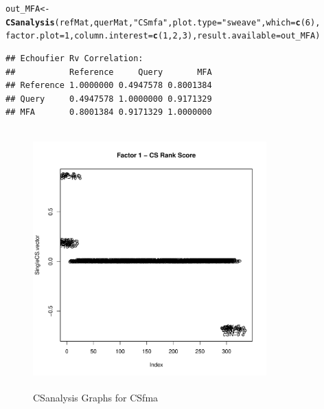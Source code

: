 \documentclass[a4paper]{article}\usepackage[]{graphicx}\usepackage[]{color}
\makeatletter
\newcommand{\hlnum}[1]{\textcolor[rgb]{0.686,0.059,0.569}{#1}}%
\newcommand{\hlstr}[1]{\textcolor[rgb]{0.192,0.494,0.8}{#1}}%
\newcommand{\hlstd}[1]{\textcolor[rgb]{0.345,0.345,0.345}{#1}}%
\newcommand{\hlkwb}[1]{\textcolor[rgb]{0.69,0.353,0.396}{#1}}%
\newcommand{\hlkwc}[1]{\textcolor[rgb]{0.333,0.667,0.333}{#1}}%
\newcommand{\hlkwd}[1]{\textcolor[rgb]{0.737,0.353,0.396}{\textbf{#1}}}%
\newenvironment{kframe}{%
 \def\at@end@of@kframe{}%
 \ifinner\ifhmode%
  \def\at@end@of@kframe{\end{minipage}}%
  \begin{minipage}{\columnwidth}%
 \fi\fi%
 \def\FrameCommand##1{\hskip\@totalleftmargin \hskip-\fboxsep
 \colorbox{shadecolor}{##1}\hskip-\fboxsep
     \hskip-\linewidth \hskip-\@totalleftmargin \hskip\columnwidth}%
 \MakeFramed {\advance\hsize-\width
   \@totalleftmargin\z@ \linewidth\hsize
   \@setminipage}}%
 {\par\unskip\endMakeFramed%
 \at@end@of@kframe}
\newenvironment{knitrout}{}{} %
\makeatother
\begin{document}
\begin{knitrout}
\color{fgcolor}\begin{kframe}
\begin{alltt}
        \hlstd{out_MFA} \hlkwb{<-} \hlkwd{CSanalysis}\hlstd{(refMat,querMat,}\hlstr{"CSmfa"}\hlstd{,}\hlkwc{plot.type}\hlstd{=}\hlstr{"sweave"}\hlstd{,}\hlkwc{which}\hlstd{=}\hlkwd{c}\hlstd{(}\hlnum{6}\hlstd{),}
                        \hlkwc{factor.plot}\hlstd{=}\hlnum{1}\hlstd{,}\hlkwc{column.interest}\hlstd{=}\hlkwd{c}\hlstd{(}\hlnum{1}\hlstd{,}\hlnum{2}\hlstd{,}\hlnum{3}\hlstd{),}\hlkwc{result.available}\hlstd{=out_MFA)}
\end{alltt}
\begin{verbatim}
## Echoufier Rv Correlation:
##           Reference     Query       MFA
## Reference 1.0000000 0.4947578 0.8001384
## Query     0.4947578 1.0000000 0.9171329
## MFA       0.8001384 0.9171329 1.0000000
\end{verbatim}
\end{kframe}\begin{figure}[H]


\includegraphics[width=9cm,height=10cm]{figure/MFA2-1} \hfill{}

\caption[CSanalysis Graphs for CSfma]{CSanalysis Graphs for CSfma\label{fig:MFA2}}
\end{figure}


\end{knitrout}
\end{document}
